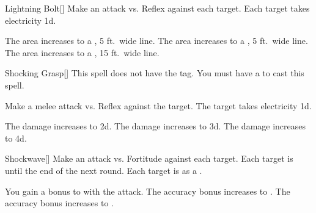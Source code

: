 \lowercase{\hypertarget{spell:Lightning Bolt}{}}\label{spell:Lightning Bolt}
\begin{freeability}[Rank 2]{\hypertarget{spell:Lightning Bolt}{Lightning Bolt}}[]
Make an attack vs. Reflex against each target.
\hit Each target takes electricity  \minus1d.

\rankline
{} The area increases to a \areahuge, 5 ft.\ wide line.
 The area increases to a \areaext, 5 ft.\ wide line.
 The area increases to a \areaext, 15 ft.\ wide line.
\end{freeability}
\vspace{0.25em}



\lowercase{\hypertarget{spell:Shocking Grasp}{}}\label{spell:Shocking Grasp}
\begin{freeability}[Rank 2]{\hypertarget{spell:Shocking Grasp}{Shocking Grasp}}[]
This spell does not have the  tag.
You must have a  to cast this spell.

Make a melee attack vs. Reflex against the target.
\hit The target takes electricity  \plus1d.

\rankline
{} The damage increases to  \plus2d.
 The damage increases to  \plus3d.
 The damage increases to  \plus4d.
\end{freeability}
\vspace{0.25em}



\lowercase{\hypertarget{spell:Shockwave}{}}\label{spell:Shockwave}
\begin{freeability}[Rank 2]{\hypertarget{spell:Shockwave}{Shockwave}}[]
Make an attack vs. Fortitude against each target.
\hit Each target is  until the end of the next round.
\crit Each target is  as a .

\rankline
{} You gain a  bonus to  with the attack.
 The accuracy bonus increases to .
 The accuracy bonus increases to .
\end{freeability}
\vspace{0.25em}



